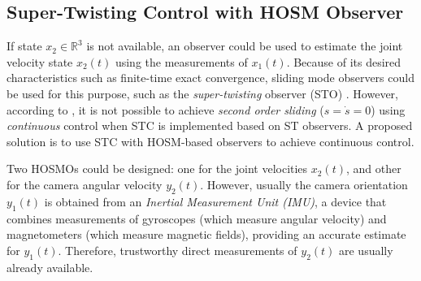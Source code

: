 \subsection{Super-Twisting Control with HOSM Observer}
\label{sec:STC_output_feedback}

If state $x_2 \in \mathbb{R}^3$ is not available, an observer could be used to estimate the joint velocity state $x_2(t)$ using the measurements of $x_1(t)$.
%
Because of its desired characteristics such as finite-time exact convergence, sliding mode observers 
could be used for this purpose, such as the {\it super-twisting} observer (STO) \cite{Moreno2012}.
%
However, according to \cite{Chalanga2016}, it is not possible to achieve {\it second order sliding} ($s=\dot{s}=0$) using {\it continuous} control when STC is implemented based on ST observers. A proposed solution is to use STC with HOSM-based observers to achieve continuous control.

\begin{remark}
Two HOSMOs could be designed: one for the joint velocities $x_2(t)$, and other for the camera angular velocity $y_2(t)$. However, usually the camera orientation $y_1(t)$ is obtained from an {\it Inertial Measurement Unit (IMU)}, a device that combines measurements of gyroscopes (which measure angular velocity) and magnetometers (which measure magnetic fields), providing an accurate estimate for $y_1(t)$. Therefore, trustworthy direct measurements of $y_2(t)$ are usually already available.
\end{remark}


